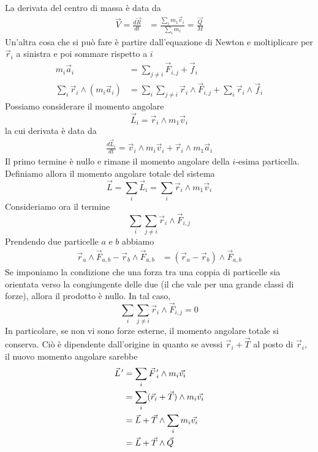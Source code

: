 \documentclass[a4paper]{article}
\begin{document}
La derivata del centro di massa è data da
\begin{align*}
    \vec{V} = \frac{d\vec{R}}{dt} &= \frac{\sum_i m_1\vec{v}_i}{\sum_i m_i} = \frac{\vec{Q}}{M}
\end{align*}
Un'altra cosa che si può fare è partire dall'equazione di Newton e moltiplicare per
\(\vec{r}_i\) a sinistra e poi sommare rispetto a \(i\)
\begin{align*}
    m_i\vec{a}_i &= \sum_{j \neq i} \vec{F}_{i,j} + \vec{f}_{i} \\
    \sum_i \vec{r}_i \wedge (m_i\vec{a}_i) &= \sum_i \sum_{j \neq i} \vec{r}_i \wedge \vec{F}_{i,j} + \sum_i \vec{r}_i \wedge \vec{f}_{i}
\end{align*}
Possiamo considerare il momento angolare
\[
    \vec{L}_i = \vec{r}_i \wedge m_1 \vec{v}_i
\]
la cui derivata è data da
\begin{align*}
    \frac{d\vec{L}_i}{dt} = \vec{v}_i \wedge m_i\vec{v}_i + \vec{r}_i \wedge m_1\vec{a}_i
\end{align*}
Il primo termine è nullo e rimane il momento angolare della \(i\)-esima particella.
Definiamo allora il momento angolare totale del sistema
\[
    \vec{L} = \sum_i \vec{L}_i = \sum_i \vec{r}_i \wedge m_1\vec{v}_i
\]
Consideriamo ora il termine
\[
    \sum_i \sum_{j\neq i} \vec{r}_i \wedge \vec{F}_{i,j}
\]
Prendendo due particelle \(a\) e \(b\) abbiamo
\begin{align*}
    \vec{r}_a \wedge \vec{F}_{a,b} - \vec{r}_b \wedge \vec{F}_{a,b}
    &= (\vec{r}_a - \vec{r}_b) \wedge \vec{F}_{a,b}
\end{align*}
Se imponiamo la condizione che una forza tra una coppia di particelle sia orientata
verso la congiungente delle due (il che vale per una grande classi di forze),
allora il prodotto è nullo.
In tal caso,
\[
    \sum_i \sum_{j\neq i} \vec{r}_i \wedge \vec{F}_{i,j} = 0
\]
In particolare, se non vi sono forze esterne, il momento angolare totale si conserva.
Ciò è dipendente dall'origine in quanto se avessi \(\vec{r}_i + \vec{T}\)
al posto di \(\vec{r}_i\), il nuovo momento angolare sarebbe
\newcommand{\pvec}[1]{\vec{#1}\mkern2mu\vphantom{#1}}
\begin{align*}
    \pvec{L}' &= \sum_i \pvec{F}_i' \wedge m_i \vec{v_i} \\
    &= \sum_i (\vec{r}_i + \vec{T}) \wedge m_i \vec{v_i} \\
    &= \vec{L} + \vec{T} \wedge \sum_i m_i \vec{v_i} \\
    &= \vec{L} + \vec{T} \wedge \vec{Q}
\end{align*}
\end{document}
